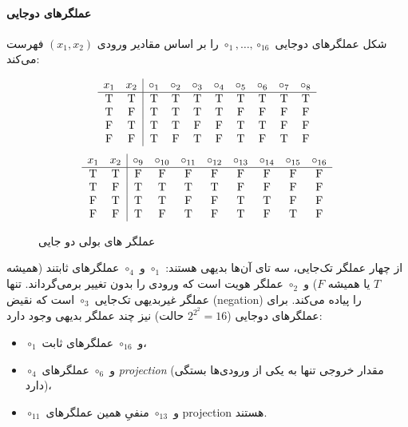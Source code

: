       \paragraph{عملگرهای دو‌جایی}
      شکل  عملگرهای دو‌جایی $\circ_1,\dots,\circ_{16}$ را بر اساس مقادیر ورودی $(x_1,x_2)$ فهرست می‌کند:
      \begin{figure}[ht]
      \centering
      \[
      \begin{array}{cc|cccccccc}
      x_1 & x_2 & \circ_1 & \circ_2 & \circ_3 & \circ_4 & \circ_5 & \circ_6 & \circ_7 & \circ_8\\\hline
      $T$ & $T$ & $T$ & $T$ & $T$ & $T$ & $T$ & $T$ & $T$ & $T$\\
      $T$ & $F$ & $T$ & $T$ & $T$ & $T$ & $F$ & $F$ & $F$ & $F$\\
      $F$ & $T$ & $T$ & $T$ & $F$ & $F$ & $T$ & $T$ & $F$ & $F$\\
      $F$ & $F$ & $T$ & $F$ & $T$ & $F$ & $T$ & $F$ & $T$ & $F$
      \end{array}
      \]
      \[
      \begin{array}{cc|cccccccc}
      x_1 & x_2 & \circ_{9} & \circ_{10} & \circ_{11} & \circ_{12} & \circ_{13} & \circ_{14} & \circ_{15} & \circ_{16}\\\hline
      $T$ & $T$ & $F$ & $F$ & $F$ & $F$ & $F$ & $F$ & $F$ & $F$\\
      $T$ & $F$ & $T$ & $T$ & $T$ & $T$ & $F$ & $F$ & $F$ & $F$\\
      $F$ & $T$ & $T$ & $T$ & $F$ & $F$ & $T$ & $T$ & $F$ & $F$\\
      $F$ & $F$ & $T$ & $F$ & $T$ & $F$ & $T$ & $F$ & $T$ & $F$
      \end{array}
      \]
      \renewcommand{\thefigure}{\lr{2.5}}
      \caption{عملگر های بولی دو جایی}
      \end{figure}
      از چهار عملگر تک‌جایی، سه تای آن‌ها بدیهی هستند: $\circ_1$ و $\circ_4$ عملگرهای ثابتند (همیشه $T$ یا همیشه $F$) و $\circ_2$ عملگر هویت است که ورودی را بدون تغییر برمی‌گرداند. تنها عملگر غیربدیهی تک‌جایی $\circ_3$ است که نقیض (negation) را پیاده می‌کند.
      برای عملگرهای دو‌جایی ($2^{2^2}=16$ حالت) نیز چند عملگر بدیهی وجود دارد:
      \begin{itemize}
        \item $\circ_1$ و $\circ_{16}$ عملگرهای ثابت،
        \item $\circ_4$ و $\circ_6$ عملگرهای \emph{projection} (مقدار خروجی تنها به یکی از ورودی‌ها بستگی دارد)،
        \item $\circ_{11}$ و $\circ_{13}$ منفیِ همین عملگرهای projection هستند.
      \end{itemize}
